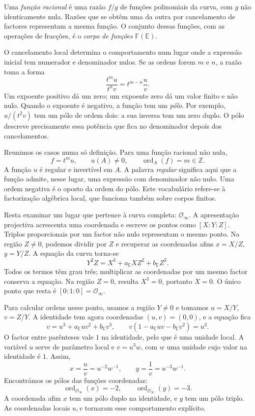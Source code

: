 Uma \emph{função racional} é uma razão \(f/g\) de funções polinomiais
da curva, com \(g\) não identicamente nula. Razões que se obtêm uma da
outra por cancelamento de factores representam a mesma função. O
conjunto dessas funções, com as operações de fracções, é o
\emph{corpo de funções} \(\mathbb F(\mathbb E)\).

O cancelamento local determina o comportamento num lugar onde a
expressão inicial tem numerador e denominador nulos. Se as ordens forem
\(m\) e \(n\), a razão toma a forma
\[
 \frac{t^m u}{t^n v}=t^{m-n}\frac uv.
\]
Um expoente positivo dá um zero; um expoente zero dá um valor finito e
não nulo. Quando o expoente é negativo, a função tem um \emph{pólo}.
Por exemplo, \(u/(t^2v)\) tem um pólo de ordem dois: a sua inversa
tem um zero duplo. O pólo descreve precisamente essa potência que fica
no denominador depois dos cancelamentos.

Reunimos os casos numa só definição. Para uma função racional não nula,
\[
 f=t^m u,
 \qquad u(A)\ne0,
 \qquad \operatorname{ord}_A(f)=m\in\mathbb Z.
\]
A função \(u\) é regular e invertível em \(A\). A palavra
\emph{regular} significa aqui que a função admite, nesse lugar, uma
expressão com denominador não nulo. Uma ordem negativa é o oposto da
ordem do pólo. Este vocabulário refere-se à factorização algébrica local,
que funciona também sobre corpos finitos.

Resta examinar um lugar que pertence à curva completa:
\(\mathcal O_\infty\). A apresentação projectiva acrescenta uma
coordenada e escreve os pontos como \([X:Y:Z]\). Triplos proporcionais
por um factor não nulo representam o mesmo ponto. Na região \(Z\ne0\),
podemos dividir por \(Z\) e recuperar as coordenadas afins
\(x=X/Z\), \(y=Y/Z\). A equação da curva torna-se
\[
 Y^2Z=X^3+a_{\mathbb E}XZ^2+b_{\mathbb E}Z^3.
\]
Todos os termos têm grau três; multiplicar as coordenadas por um mesmo
factor conserva a equação. Na região \(Z=0\), resulta \(X^3=0\),
portanto \(X=0\). O único ponto que resta é
\([0:1:0]=\mathcal O_\infty\).

Para calcular ordens nesse ponto, usamos a região \(Y\ne0\) e
tomamos \(u=X/Y\), \(v=Z/Y\). A identidade tem agora coordenadas
\((u,v)=(0,0)\), e a equação fica
\[
 v=u^3+a_{\mathbb E}uv^2+b_{\mathbb E}v^3,
 \qquad
 v(1-a_{\mathbb E}uv-b_{\mathbb E}v^2)=u^3.
\]
O factor entre parênteses vale \(1\) na identidade, pelo que é uma
unidade local. A variável \(u\) serve de parâmetro local e
\(v=u^3w\), com \(w\) uma unidade cujo valor na identidade é \(1\).
Assim,
\[
 x=\frac uv=u^{-2}w^{-1},
 \qquad y=\frac1v=u^{-3}w^{-1}.
\]
Encontrámos os pólos das funções coordenadas:
\[
 \operatorname{ord}_{\mathcal O_\infty}(x)=-2,
 \qquad
 \operatorname{ord}_{\mathcal O_\infty}(y)=-3.
\]
A coordenada afim \(x\) tem um pólo duplo na identidade, e \(y\)
tem um pólo triplo. As coordenadas locais \(u,v\) tornaram esse
comportamento explícito.

